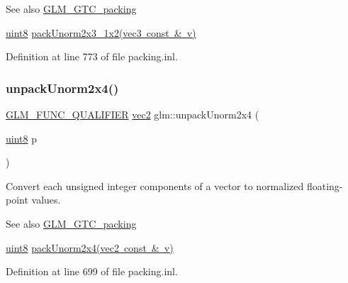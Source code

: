 \begin{DoxySeeAlso}{See also}
\mbox{\hyperlink{group__gtc__packing}{G\+L\+M\+\_\+\+G\+T\+C\+\_\+packing}} 

\mbox{\hyperlink{group__gtc__type__precision_ga1a7dcd8aac97cc8020817c94049deff2}{uint8}} \mbox{\hyperlink{group__gtc__packing_ga0acca4eb99c300fe2edeef7ebd8fa08b}{pack\+Unorm2x3\+\_\+1x2(vec3 const \& v)}} 
\end{DoxySeeAlso}


Definition at line 773 of file packing.\+inl.

\mbox{\label{group__gtc__packing_ga3afb0452954320f2d83fe6f38cb24147}} 
\subsubsection{\texorpdfstring{unpackUnorm2x4()}{unpackUnorm2x4()}}
{\footnotesize\ttfamily \mbox{\hyperlink{setup_8hpp_a33fdea6f91c5f834105f7415e2a64407}{G\+L\+M\+\_\+\+F\+U\+N\+C\+\_\+\+Q\+U\+A\+L\+I\+F\+I\+ER}} \mbox{\hyperlink{group__core__types_gaa1618f51db67eaa145db101d8c8431d8}{vec2}} glm\+::unpack\+Unorm2x4 (\begin{DoxyParamCaption}\item[{\mbox{\hyperlink{group__gtc__type__precision_ga1a7dcd8aac97cc8020817c94049deff2}{uint8}}}]{p }\end{DoxyParamCaption})}

Convert each unsigned integer components of a vector to normalized floating-\/point values.

\begin{DoxySeeAlso}{See also}
\mbox{\hyperlink{group__gtc__packing}{G\+L\+M\+\_\+\+G\+T\+C\+\_\+packing}} 

\mbox{\hyperlink{group__gtc__type__precision_ga1a7dcd8aac97cc8020817c94049deff2}{uint8}} \mbox{\hyperlink{group__gtc__packing_gad68eb2f848ba867192b8787998c0595a}{pack\+Unorm2x4(vec2 const \& v)}} 
\end{DoxySeeAlso}


Definition at line 699 of file packing.\+inl.

\mbox{\label{group__gtc__packing_ga96ce0c24339ee676e28a027fffd1edf6}} 
